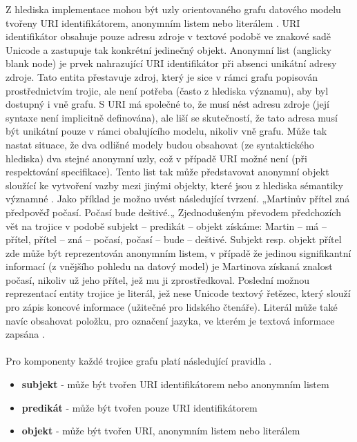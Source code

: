 \documentclass{projekt}
\begin{document}
Z hlediska implementace mohou být uzly orientovaného grafu datového modelu tvořeny URI identifikátorem, anonymním listem nebo literálem \cite{_6}. URI identifikátor obsahuje pouze adresu zdroje v textové podobě ve znakové sadě Unicode a zastupuje tak konkrétní jedinečný objekt. Anonymní list (anglicky blank node) je prvek nahrazující URI identifikátor při absenci unikátní adresy zdroje. Tato entita přestavuje zdroj, který je sice v rámci grafu popisován prostřednictvím trojic, ale není potřeba (často z hlediska významu), aby byl dostupný i vně grafu. S URI má společné to, že musí nést adresu zdroje (její syntaxe není implicitně definována), ale liší se skutečností, že tato adresa musí být unikátní pouze v rámci obalujícího modelu, nikoliv vně grafu. Může tak nastat situace, že dva odlišné modely budou obsahovat (ze syntaktického hlediska) dva stejné anonymní uzly, což v případě URI možné není (při respektování specifikace). Tento list tak může představovat anonymní objekt sloužící ke vytvoření vazby mezi jinými objekty, které jsou z hlediska sémantiky významné \cite{_5}. Jako příklad je možno uvést následující tvrzení. „Martinův přítel zná předpověď počasí. Počasí bude deštivé.„ Zjednodušeným převodem předchozích vět na trojice v podobě subjekt – predikát – objekt získáme: Martin – má – přítel, přítel – zná – počasí, počasí – bude – deštivé. 
Subjekt resp. objekt přítel zde může být reprezentován anonymním listem, v případě že jedinou signifikantní informací (z vnějšího pohledu na datový model) je Martinova získaná znalost počasí, nikoliv už jeho přítel, jež mu ji zprostředkoval. 
Poslední možnou reprezentací entity trojice je literál, jež nese Unicode textový řetězec, který slouží pro zápis koncové informace (užitečné pro lidského čtenáře). Literál může také navíc obsahovat položku, pro označení jazyka, ve kterém je textová informace zapsána \cite{_6}. 
\\
\\
Pro komponenty každé trojice grafu platí následující pravidla \cite{_6}.

\begin {itemize}

\item \textbf{subjekt} - může být tvořen URI identifikátorem nebo anonymním listem
\item \textbf{predikát} - může být tvořen pouze URI identifikátorem
\item \textbf{objekt} - může být tvořen URI, anonymním listem nebo literálem

\end{itemize}
\end{document}
